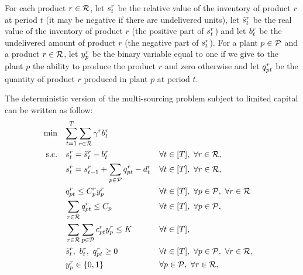 For each product $r\in\mathcal{R}$, let $s_t^r$ be the relative value of the inventory of product $r$ at period $t$ (\ie it may be negative if there are undelivered units), let $\tilde{s}_t^r$ be the real value of the inventory of product $r$ (\ie the positive part of $s_t^r$) and let $b_t^r$ be the undelivered amount of product $r$ (\ie the negative part of $s_t^r$). For a plant $p\in\mathcal{P}$ and a product $r\in\mathcal{R}$, let $y_p^r$ be the binary variable equal to one if we give to the plant $p$ the ability to produce the product $r$ and zero otherwise and let $q_{pt}^r$ be the quantity of product $r$ produced in plant $p$ at period $t$.

The deterministic version of the multi-sourcing problem subject to limited capital can be written as follow:
\begin{subequations}\label{eq:multi-sourcing - limited capital}
  \begin{align}
    \min\quad & \rlap{$\ds \sum_{t=1}^{\horizon} \sum_{r\in\REF} \backorder^r \backlog_t^r$}
    \label{eq:multi-sourcing - limited capital - objective}
    \\
    \st\quad & \ds \inventory_t^r = \excess_t^r - \backlog_t^r && \forall t\in\range{\horizon},\ \forall r\in\REF,
    \label{eq:multi-sourcing - limited capital - inventory}
    \\
    & \ds \inventory_t^r = \inventory_{t-1}^r + \sum_{p\in\plants}\quantity_{pt}^r - \demand_t^r && \forall t\in\range{\horizon},\ \forall r\in\REF,
    \label{eq:multi-sourcing - limited capital - dynamic}
    \\
    & \ds \quantity_{pt}^r \le \capacity_p^r \assign_p^r && \forall t\in\range{\horizon},\ \forall p\in\plants,\ \forall r\in\REF
    \label{eq:multi-sourcing - limited capital - big M}
    \\
    & \ds \sum_{r\in\REF}\quantity_{pt}^r \le \capacity_p && \forall t\in\range{\horizon},\ \forall p\in\plants,
    \label{eq:multi-sourcing - limited capital - capacity}
    \\
    & \ds \sum_{r\in\REF} \sum_{p\in\plants}\affect_{pt}^r\assign_p^r \le \capital && \forall t\in\range{\horizon},
    \label{eq:multi-sourcing - limited capital - capital}
    \\
    & \ds \excess_t^r,\ \backlog_t^r,\ \quantity_{pt}^r \ge 0 && \forall t\in\range{\horizon},\ \forall p\in\plants,\ \forall r\in\REF,
    \label{eq:multi-sourcing - limited capital - nonnegativity}
    \\
    & \ds \assign_p^r \in \crbracket{0,1} && \forall p\in\plants,\ \forall r\in\REF,
    \label{eq:multi-sourcing - limited capital - binary}
  \end{align}
\end{subequations}


